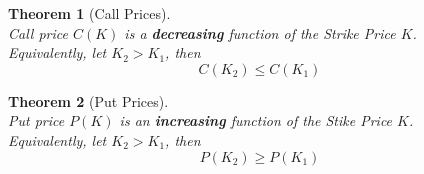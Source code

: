 \documentclass[12pt]{article}
\newtheorem{theorem}{Theorem}[section]
\theoremstyle{definition}
\begin{document}
\begin{theorem}[Call Prices]
\hfill\\\normalfont Call price $C(K)$ is a \textbf{decreasing} function of the Strike Price $K$. \\Equivalently, let $K_2>K_1$, then
\[
C(K_2)\leq C(K_1)
\]  
\end{theorem}
\begin{theorem}[Put Prices]
\hfill\\\normalfont Put price $P(K)$ is an \textbf{increasing} function of the Stike Price $K$.\\Equivalently, let $K_2>K_1$, then
\[
P(K_2)\geq P(K_1)
\]
\end{theorem}
\end{document}
